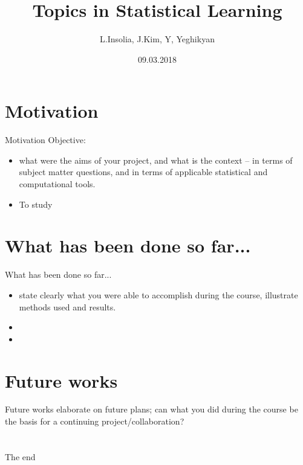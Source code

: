 \documentclass{beamer}
\title[TSL]{Topics in Statistical Learning}
\author{L.Insolia, J.Kim, Y, Yeghikyan}
\institute{Scuola Normale Superiore}
\date{09.03.2018}
\begin{document}
\begin{frame}
  \titlepage
\end{frame}
\section{Motivation}
\begin{frame}{Motivation}
Objective:
\begin{itemize}
  \item what were the aims of your project, and what is the context – in terms of subject matter questions, and in terms of applicable statistical and computational tools. 
  \item To study 
\end{itemize}
\vskip 1cm
\end{frame}


\section{What has been done so far...}
\begin{frame}{What has been done so far...}
\begin{itemize}
\item state clearly what you were able to accomplish during the course, illustrate methods used and results.
\item 
\item 
\end{itemize}
\end{frame}


\section{Future works}
\begin{frame}{Future works}
 elaborate on future plans; can what you did during the course be the basis for a continuing project/collaboration? 

\end{frame}

\section{}
\begin{frame}
The end
\end{frame}
\end{document}
